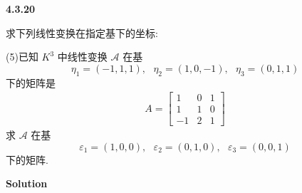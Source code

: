 \documentclass[11pt,a4paper,openany,oneside]{book}
\newcommand\Solution{\noindent\textbf{\textsf{Solution}}\par\medskip}
\begin{document}
\begin{myexample}
	\textbf{4.3.20}

求下列线性变换在指定基下的坐标:

(5)已知 $ K^3 $ 中线性变换 $ \mathcal{A} $ 在基
 $$  \eta_1=(-1, 1, 1), \ \ \ \eta_2=(1, 0, -1), \ \ \ \eta_3=(0, 1, 1)  $$ 
下的矩阵是
\begin{gather*}
A=
\begin{bmatrix}
1  &  0  &  1  \\
1  &  1  &  0  \\
-1  &  2  &  1  
\end{bmatrix}
\end{gather*}
求 $ \mathcal{A} $ 在基
 $$  \varepsilon_1=(1,0,0), \ \ \ \varepsilon_2=(0, 1, 0), \ \ \ \varepsilon_3=(0, 0, 1)  $$ 
下的矩阵.  \\ 

\end{myexample}
\Solution
\end{document}

